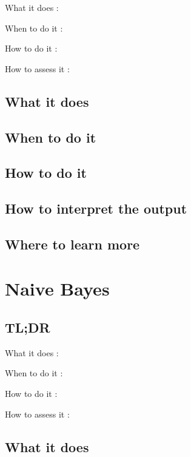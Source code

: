 \documentclass[
]{book}
\begin{document}
What it does
:

When to do it
:

How to do it
:

How to assess it
:

\hypertarget{what-it-does-5}{%
\section{What it does}\label{what-it-does-5}}

\hypertarget{when-to-do-it-5}{%
\section{When to do it}\label{when-to-do-it-5}}

\hypertarget{how-to-do-it-5}{%
\section{How to do it}\label{how-to-do-it-5}}

\hypertarget{how-to-interpret-the-output-5}{%
\section{How to interpret the output}\label{how-to-interpret-the-output-5}}

\hypertarget{where-to-learn-more-5}{%
\section{Where to learn more}\label{where-to-learn-more-5}}

\hypertarget{naive-bayes}{%
\chapter{Naive Bayes}\label{naive-bayes}}

\hypertarget{tldr-6}{%
\section{TL;DR}\label{tldr-6}}

What it does
:

When to do it
:

How to do it
:

How to assess it
:

\hypertarget{what-it-does-6}{%
\section{What it does}\label{what-it-does-6}}
\end{document}
